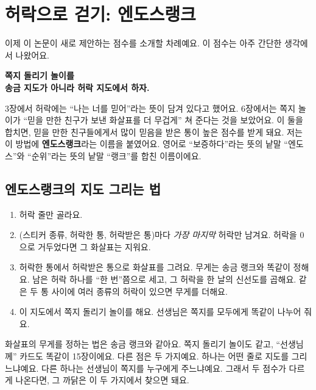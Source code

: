 \chapter{허락으로 걷기: 엔도스랭크}

이제 이 논문이 새로 제안하는 점수를 소개할 차례예요.
이 점수는 아주 간단한 생각에서 나왔어요.

\begin{center}
\begin{tcolorbox}[colback=white, colframe=allowcol, boxrule=0.8pt, arc=2mm, width=0.9\linewidth, halign=center]
\titlefont\bfseries 쪽지 돌리기 놀이를\\송금 지도가 아니라 허락 지도에서 하자.
\end{tcolorbox}
\end{center}

3장에서 허락에는 “나는 너를 믿어”라는 뜻이 담겨 있다고 했어요.
6장에서는 쪽지 놀이가 “믿을 만한 친구가 보낸 화살표를 더 무겁게” 쳐 준다는 것을 보았어요.
이 둘을 합치면, 믿을 만한 친구들에게서 많이 믿음을 받은 통이 높은 점수를 받게 돼요.
저는 이 방법에 \textbf{엔도스랭크}라는 이름을 붙였어요.
영어로 “보증하다”라는 뜻의 낱말 “엔도스”와 “순위”라는 뜻의 낱말 “랭크”를 합친 이름이에요.

\section{엔도스랭크의 지도 그리는 법}

\begin{enumerate}
\item 허락 줄만 골라요.
\item (스티커 종류, 허락한 통, 허락받은 통)마다 \emph{가장 마지막} 허락만 남겨요.
      허락을 0으로 거두었다면 그 화살표는 지워요.
\item 허락한 통에서 허락받은 통으로 화살표를 그려요.
      무게는 송금 랭크와 똑같이 정해요. 남은 허락 하나를 “한 번”쯤으로 세고, 그 허락을 한 날의 신선도를 곱해요.
      같은 두 통 사이에 여러 종류의 허락이 있으면 무게를 더해요.
\item 이 지도에서 쪽지 돌리기 놀이를 해요. 선생님은 쪽지를 모두에게 똑같이 나누어 줘요.
\end{enumerate}

화살표의 무게를 정하는 법은 송금 랭크와 같아요.
쪽지 돌리기 놀이도 같고, “선생님께” 카드도 똑같이 15장이에요.
다른 점은 두 가지예요.
하나는 어떤 줄로 지도를 그리느냐예요.
다른 하나는 선생님이 쪽지를 누구에게 주느냐예요.
그래서 두 점수가 다르게 나온다면, 그 까닭은 이 두 가지에서 찾으면 돼요.

